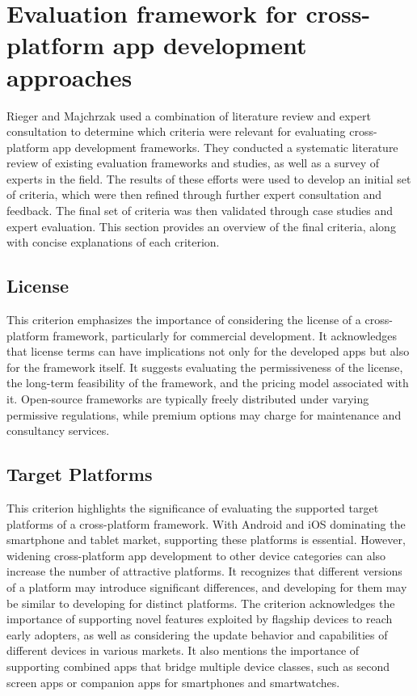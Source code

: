 \section{Evaluation framework for cross-platform app
development approaches}

Rieger and Majchrzak used a combination of literature review and expert consultation to determine which criteria were relevant for evaluating cross-platform app development frameworks. They conducted a systematic literature review of existing evaluation frameworks and studies, as well as a survey of experts in the field. The results of these efforts were used to develop an initial set of criteria, which were then refined through further expert consultation and feedback. The final set of criteria was then validated through case studies and expert evaluation.
This section provides an overview of the final criteria, along with concise explanations of each criterion.

\subsection{License} 
This criterion emphasizes the importance of considering the license of a cross-platform framework, particularly for commercial development. It acknowledges that license terms can have implications not only for the developed apps but also for the framework itself. It suggests evaluating the permissiveness of the license, the long-term feasibility of the framework, and the pricing model associated with it. Open-source frameworks are typically freely distributed under varying permissive regulations, while premium options may charge for maintenance and consultancy services.

\subsection{Target Platforms} 
This criterion highlights the significance of evaluating the supported target platforms of a cross-platform framework. With Android and iOS dominating the smartphone and tablet market, supporting these platforms is essential. However, widening cross-platform app development to other device categories can also increase the number of attractive platforms. It recognizes that different versions of a platform may introduce significant differences, and developing for them may be similar to developing for distinct platforms. The criterion acknowledges the importance of supporting novel features exploited by flagship devices to reach early adopters, as well as considering the update behavior and capabilities of different devices in various markets. It also mentions the importance of supporting combined apps that bridge multiple device classes, such as second screen apps or companion apps for smartphones and smartwatches.

